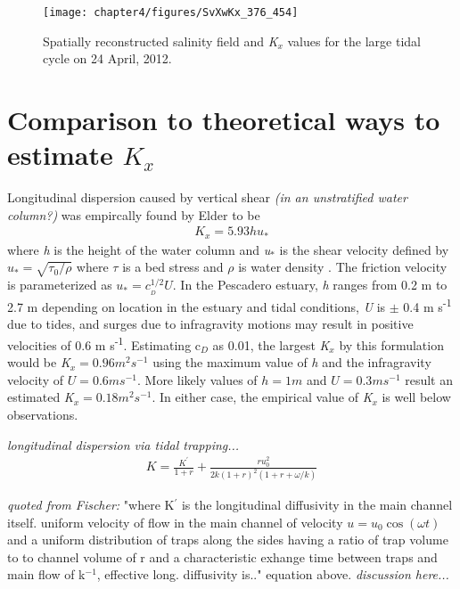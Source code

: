 \begin{figure}[hp]
\centering
	\texttt{[image: chapter4/figures/SvXwKx\_376\_454]} 
\caption{Spatially reconstructed salinity field and \emph{K$_x$} values for the large tidal cycle on 24 April, 2012.} \label{fig:Kx424}
\end{figure}




\section{Comparison to theoretical ways to estimate $K_x$}

Longitudinal dispersion caused by vertical shear \emph{(in an unstratified water column?)} was empircally found by Elder to be
\begin{eqnarray}
K_x = 5.93hu_* \label{eq:Kshear}
\end{eqnarray}
where \emph{h} is the height of the water column and \emph{u$_*$} is the shear velocity defined by $u_*=\sqrt{\tau_0/\rho}$ where $\tau$ is a bed stress and $\rho$ is water density \parencite*{elder_dispersion_1959}. The friction velocity is parameterized as $u_* = c_{_D}^{1/2}U$. In the Pescadero estuary, \emph{h} ranges from 0.2 m to 2.7 m depending on location in the estuary and tidal conditions, \emph{U} is $\pm$ 0.4 m s\textsuperscript{-1} due to tides, and surges due to infragravity motions may result in positive velocities of 0.6 m s\textsuperscript{-1}. Estimating c$_D$ as 0.01, the largest \emph{K$_x$} by this formulation would be \emph{K$_x = 0.96 m^2 s^{-1}$} using the maximum value of \emph{h} and the infragravity velocity of $U = 0.6 m s^{-1}$. More likely values of $h = 1 m$ and $U = 0.3 m s^{-1}$ result an estimated \emph{K$_x = 0.18 m^2 s^{-1}$}. In either case, the empirical value of \emph{K$_x$} is well below observations.

\emph{longitudinal dispersion via tidal trapping...}
\begin{eqnarray}
K = \frac{K^{'}}{1+r} + \frac{ru_0^2}{2k(1+r)^2(1+r+\omega / k)} \label{eq:KxOkubo}
\end{eqnarray}

\emph{quoted from Fischer:} "where K$^{'}$ is the longitudinal diffusivity in the main channel itself. uniform velocity of flow in the main channel of velocity $u = u_0 \cos(\omega t)$ and a uniform distribution of traps along the sides having a ratio of trap volume to to channel volume of r and a characteristic exhange time between traps and main flow of k$^{-1}$, effective long. diffusivity is.." equation above. \emph{discussion here...}

